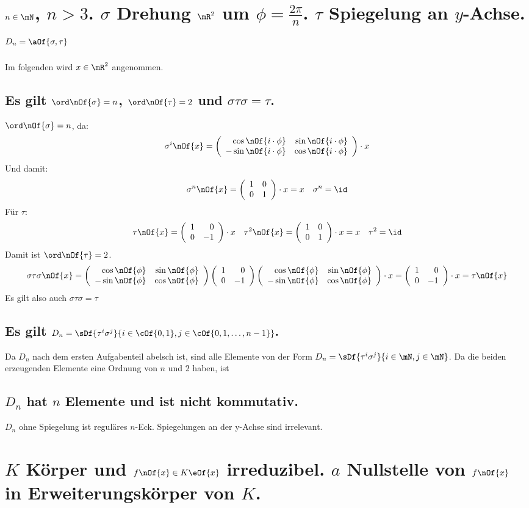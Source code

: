 \documentclass[11pt,a4paper]{scrartcl}
\newcommand{\tauMat}{\left(\begin{array}{r r} 1 & 0 \\ 0 & -1\end{array}\right)}
\newcommand{\idMat}{\left(\begin{array}{r r} 1 & 0 \\ 0 & 1\end{array}\right)}
\newcommand{\sigMat}{\left(\begin{array}{r r} \cos \nOf{\phi} & \sin \nOf{\phi} \\ -\sin \nOf{\phi} & \cos \nOf{\phi} \end{array}\right)}
\newcommand{\sigiMt}{\left(\begin{array}{r r} \cos \nOf{i\cdot\phi} & \sin \nOf{i\cdot\phi} \\ -\sin \nOf{i\cdot\phi} & \cos \nOf{i\cdot\phi} \end{array}\right)}
\begin{document}
\section{$n\in \mN$, $n > 3$. $\sigma$ Drehung $\mR^2$ um $\phi = \frac{2\pi}{n}$. $\tau$ Spiegelung an $y$-Achse. $D_n = \aOf{\sigma,\tau}$}
Im folgenden wird $x\in \mR^2$ angenommen.
\subsection{Es gilt $\ord\nOf{\sigma} = n$, $\ord\nOf{\tau} = 2$ und $\sigma\tau\sigma = \tau$.}
$\ord\nOf{\sigma} = n$, da:
\begin{equation}
	\sigma^i\nOf{x} = \sigiMt \cdot x
\end{equation}
Und damit:
\begin{equation}
	\sigma^n\nOf{x} = \idMat \cdot x = x \quad \sigma^n = \id
\end{equation}
Für $\tau$:
\begin{equation}
	\tau\nOf{x} = \tauMat\cdot x \quad \tau^2\nOf{x} = \left(\begin{array}{r r} 1 & 0 \\ 0 & 1\end{array}\right)\cdot x = x \quad \tau^2 = \id
\end{equation}
Damit ist $\ord\nOf{\tau} = 2$.
\begin{equation}
	\sigma\tau\sigma\nOf{x} = \sigMat \tauMat \sigMat \cdot x = \tauMat \cdot x = \tau\nOf{x}
\end{equation}
Es gilt also auch $\sigma\tau\sigma = \tau$

\subsection{Es gilt $D_n = \sDf{\tau^i\sigma^j}{i\in\cOf{0,1}, j\in\cOf{0,1,\dots,n-1}}$.}
Da $D_n$ nach dem ersten Aufgabenteil abelsch ist, sind alle Elemente von der Form $D_n = \sDf{\tau^i\sigma^j}{i\in\mN, j\in\mN}$. Da die beiden erzeugenden Elemente eine Ordnung von $n$ und $2$ haben, ist 

\subsection{$D_n$ hat $n$ Elemente und ist nicht kommutativ.}
$D_n$ ohne Spiegelung ist reguläres $n$-Eck. Spiegelungen an der y-Achse sind irrelevant.

\section{$K$ Körper und $f\nOf{x}\in K \eOf{x}$ irreduzibel. $a$ Nullstelle von $f\nOf{x}$ in Erweiterungskörper von $K$.}
\end{document}
